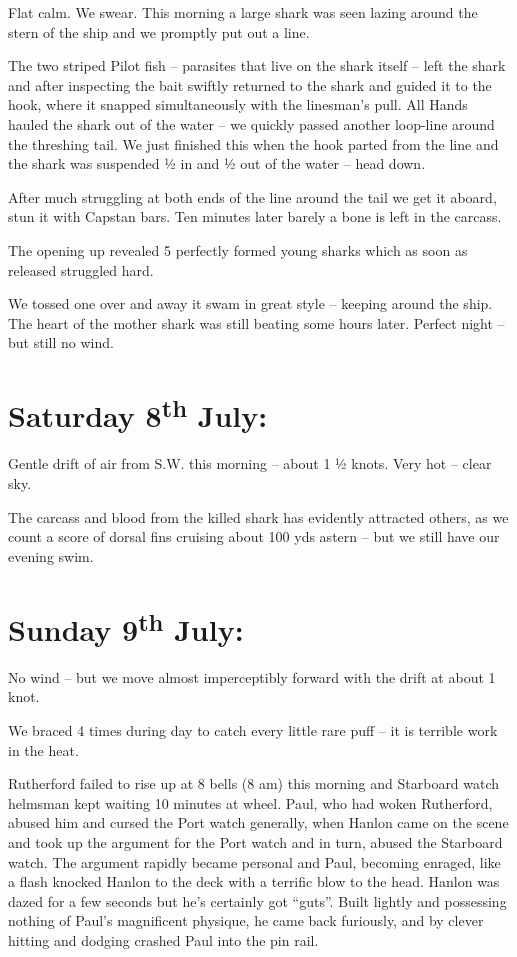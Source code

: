 \documentclass[
  11pt,
  msmallroyalvopaper
]{memoir}
\begin{document}
Flat calm. We swear. This morning a large shark was seen lazing around
the stern of the ship and we promptly put out a line.

The two striped Pilot fish -- parasites that live on the shark itself --
left the shark and after inspecting the bait swiftly returned to the
shark and guided it to the hook, where it snapped simultaneously with
the linesman's pull. All Hands hauled the shark out of the water -- we
quickly passed another loop-line around the threshing tail. We just
finished this when the hook parted from the line and the shark was
suspended ½ in and ½ out of the water -- head down.

After much struggling at both ends of the line around the tail we get it
aboard, stun it with Capstan bars. Ten minutes later barely a bone is
left in the carcass.

The opening up revealed 5 perfectly formed young sharks which as soon as
released struggled hard.

We tossed one over and away it swam in great style -- keeping around the
ship. The heart of the mother shark was still beating some hours later.
Perfect night -- but still no wind.

\hypertarget{saturday-8th-july}{%
\section{\texorpdfstring{Saturday 8\textsuperscript{th}
July:}{Saturday 8th July:}}\label{saturday-8th-july}}

Gentle drift of air from S.W. this morning -- about 1 ½ knots. Very hot
-- clear sky.

The carcass and blood from the killed shark has evidently attracted
others, as we count a score of dorsal fins cruising about 100 yds astern
-- but we still have our evening swim.

\hypertarget{sunday-9th-july}{%
\section{\texorpdfstring{Sunday 9\textsuperscript{th}
July:}{Sunday 9th July:}}\label{sunday-9th-july}}

No wind -- but we move almost imperceptibly forward with the drift at
about 1 knot.

We braced 4 times during day to catch every little rare puff -- it is
terrible work in the heat.

Rutherford failed to rise up at 8 bells (8 am) this morning and
Starboard watch helmsman kept waiting 10 minutes at wheel. Paul, who had
woken Rutherford, abused him and cursed the Port watch generally, when
Hanlon came on the scene and took up the argument for the Port watch and
in turn, abused the Starboard watch. The argument rapidly became
personal and Paul, becoming enraged, like a flash knocked Hanlon to the
deck with a terrific blow to the head. Hanlon was dazed for a few
seconds but he's certainly got ``guts''. Built lightly and possessing
nothing of Paul's magnificent physique, he came back furiously, and by
clever hitting and dodging crashed Paul into the pin rail.
\end{document}
